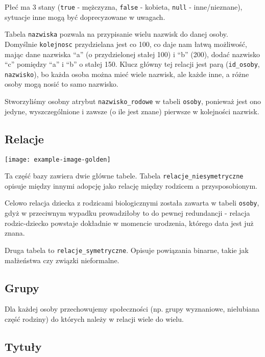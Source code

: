 \documentclass{article}
\begin{document}
Płeć ma 3 stany (\texttt{true} - mężczyzna, \texttt{false} - kobieta, \texttt{null} - inne/nieznane), sytuacje inne mogą być doprecyzowane w uwagach.

Tabela \texttt{nazwiska} pozwala na przypisanie wielu nazwisk do danej osoby. Domyślnie \texttt{kolejnosc} przydzielana jest co 100, co daje nam łatwą możliwość, mając dane nazwiska “a” (o przydzielonej stałej 100) i “b” (200), dodać nazwisko “c” pomiędzy “a” i “b” o stałej 150. Klucz główny tej relacji jest parą (\texttt{id\_osoby}, \texttt{nazwisko}), bo każda osoba można mieć wiele nazwisk, ale każde inne, a różne osoby mogą nosić to samo nazwisko.

Stworzyliśmy osobny atrybut \texttt{nazwisko\_rodowe} w tabeli \texttt{osoby}, ponieważ jest ono jedyne, wyszczególnione i zawsze (o ile jest znane) pierwsze w kolejności nazwisk.

\subsection{Relacje}

\begin{center}
    \texttt{[image: example-image-golden]}
\end{center}

Ta część bazy zawiera dwie główne tabele. Tabela \texttt{relacje\_niesymetryczne} opisuje między innymi adopcję jako relację między rodzicem a przysposobionym.

Celowo relacja dziecka z rodzicami biologicznymi została zawarta w tabeli \texttt{osoby}, gdyż w przeciwnym wypadku prowadziłoby to do pewnej redundancji - relacja
rodzic-dziecko powstaje dokładnie w momencie urodzenia, którego data jest już znana.

Druga tabela to \texttt{relacje\_symetryczne}. Opisuje powiązania binarne, takie jak małżeństwa czy związki nieformalne.

\subsection{Grupy}

Dla każdej osoby przechowujemy społeczności (np. grupy wyznaniowe, nielubiana część rodziny) do których należy w relacji wiele do wielu.

\subsection{Tytuły}
\end{document}
